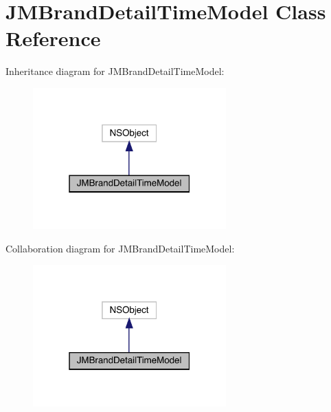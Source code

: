 \hypertarget{interface_j_m_brand_detail_time_model}{}\section{J\+M\+Brand\+Detail\+Time\+Model Class Reference}
\label{interface_j_m_brand_detail_time_model}


Inheritance diagram for J\+M\+Brand\+Detail\+Time\+Model\+:\nopagebreak
\begin{figure}[H]
\begin{center}
\leavevmode
\includegraphics[width=211pt]{interface_j_m_brand_detail_time_model__inherit__graph}
\end{center}
\end{figure}


Collaboration diagram for J\+M\+Brand\+Detail\+Time\+Model\+:\nopagebreak
\begin{figure}[H]
\begin{center}
\leavevmode
\includegraphics[width=211pt]{interface_j_m_brand_detail_time_model__coll__graph}
\end{center}
\end{figure}
